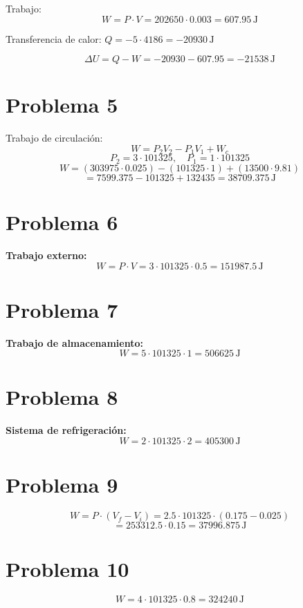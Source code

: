 \documentclass[11pt,a4paper]{article}
\begin{document}
Trabajo:
\[
W = P \cdot V = 202650 \cdot 0.003 = 607.95 \, \mathrm{J}
\]

Transferencia de calor: $Q = -5 \cdot 4186 = -20930 \, \mathrm{J}$

\[
\Delta U = Q - W = -20930 - 607.95 = -21538 \, \mathrm{J}
\]

\section*{Problema 5}
Trabajo de circulación:
\[
W = P_2 V_2 - P_1 V_1 + W_c
\]
\[
P_2 = 3 \cdot 101325, \quad P_1 = 1 \cdot 101325
\]
\[
W = (303975 \cdot 0.025) - (101325 \cdot 1) + (13500 \cdot 9.81)
\]
\[
= 7599.375 - 101325 + 132435 = 38709.375 \, \mathrm{J}
\]

\section*{Problema 6}
\textbf{Trabajo externo:}
\[
W = P \cdot V = 3 \cdot 101325 \cdot 0.5 = 151987.5 \, \mathrm{J}
\]

\section*{Problema 7}
\textbf{Trabajo de almacenamiento:}
\[
W = 5 \cdot 101325 \cdot 1 = 506625 \, \mathrm{J}
\]

\section*{Problema 8}
\textbf{Sistema de refrigeración:}
\[
W = 2 \cdot 101325 \cdot 2 = 405300 \, \mathrm{J}
\]

\section*{Problema 9}
\[
W = P \cdot (V_f - V_i) = 2.5 \cdot 101325 \cdot (0.175 - 0.025)
\]
\[
= 253312.5 \cdot 0.15 = 37996.875 \, \mathrm{J}
\]

\section*{Problema 10}
\[
W = 4 \cdot 101325 \cdot 0.8 = 324240 \, \mathrm{J}
\]
\end{document}
